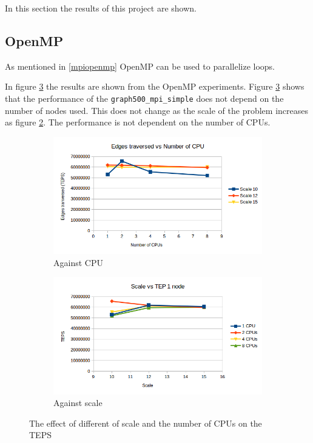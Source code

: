 In this section the results of this project are shown.

\subsection{OpenMP}
\label{sec:openmp}
As mentioned in \ref{mpiopenmp} OpenMP can be used to parallelize loops.

In figure \ref{fig:openmp_scale_cpu} the results are shown from the OpenMP experiments. 
Figure \ref{fig:openmp_scale_cpu} shows that the performance of the \texttt{graph500\_mpi\_simple} does not depend on the number of nodes used. This does not change as the scale of the problem increases as figure \ref{fig:openmp_scale}. The performance is not dependent on the number of CPUs.    

\begin{figure}[!h]
\centering
\begin{subfigure}{.5\textwidth}
  \centering
  \includegraphics[width=\linewidth]{images/openmp_cpus.png}
  \caption{Against CPU}
  \label{fig:openmp_cpu}
\end{subfigure}%
\begin{subfigure}{.5\textwidth}
  \centering
  \includegraphics[width=\linewidth]{images/openmp_scale.png}
  \caption{Against scale}
  \label{fig:openmp_scale}
\end{subfigure}
\caption{The effect of different of scale and the number of CPUs on the TEPS}
\label{fig:openmp_scale_cpu}
\end{figure}

